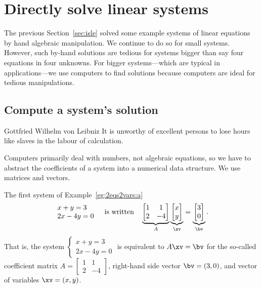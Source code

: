 
\section{Directly solve linear systems}
\label{sec:dmsls}
\secttoc

\begin{comment}
\pooliv{p.64--82}  \layiv{\S1.2} \holti{\S1.2}
\end{comment}




The previous Section~\ref{sec:isle} solved some example systems of linear equations by hand algebraic manipulation.  
We  continue to do so for small systems.  
However, such by-hand solutions are tedious for systems bigger than say four equations in four unknowns.  
For bigger systems---which are typical in applications---we use computers to find solutions because computers are ideal for tedious manipulations.


\subsection{Compute a system's solution}

\begin{quoted}{Gottfried Wilhelm von Leibniz}
It is unworthy of excellent persons to lose hours like slaves in the labour of calculation.
\end{quoted}

Computers primarily deal with numbers, not algebraic equations, so we have to abstract the coefficients of a system into a numerical data structure.
We use matrices and vectors.
\begin{example} \label{eg:}
The first system of Example~\ref{eg:2eqs2vars:a}
\begin{equation*}
\begin{array}{l} x+y=3\\2x-4y=0 \end{array}
\quad\text{is written}\quad
\underbrace{\begin{bmatrix} 1&1\\2&-4 \end{bmatrix}}_A
\underbrace{\begin{bmatrix} x\\y \end{bmatrix}}_\xv
=\underbrace{\begin{bmatrix} 3\\0 \end{bmatrix}}_\bv .
\end{equation*}
That is, the system \(\begin{cases} x+y=3\\2x-4y=0 \end{cases}\)
is equivalent to \(A\xv=\bv\) for the so-called coefficient matrix \(A=\begin{bmatrix} 1&1\\2&-4 \end{bmatrix}\), right-hand side vector \(\bv=(3,0)\), and vector of variables \(\xv=(x,y)\).
\end{example}


